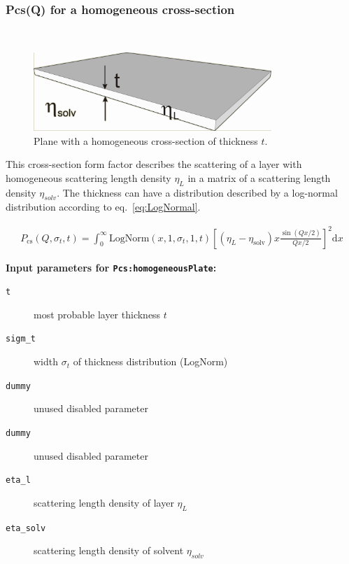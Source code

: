 \clearpage

\subsubsection{Pcs(Q) for a homogeneous cross-section}
\label{plugin:Pcs:homogeneousXS} ~\\

\begin{figure}[htb]
\begin{center}
\includegraphics[width=0.802\textwidth,height=0.265\textwidth]{../images/form_factor/anisotropic/Pcs_homogeneousXS_txt.png}
\end{center}
\caption{Plane with a homogeneous cross-section of thickness $t$.}
\label{fig:homogeneousXS}
\end{figure}

This cross-section form factor describes the scattering of a layer with homogeneous
scattering length density $\eta_L$ in a matrix of a scattering length density $\eta_{solv}$.
The thickness can have a distribution described by a log-normal distribution according to eq.\ \ref{eq:LogNormal}.

\begin{align}
P_\text{cs}(Q,\sigma_{t},t) = \int_0^\infty \textrm{LogNorm}(x,1,\sigma_{t},1,t)
    \left[ \left(\eta_L-\eta_\textrm{solv}\right) x \frac{\sin(Qx/2)}{Qx/2} \right]^2\textrm{d}x
\end{align}

\noindent
\textbf{Input parameters for \texttt{Pcs:homogeneousPlate}:}
\begin{description}
    \item[\texttt{t}] most probable layer thickness $t$
    \item[\texttt{sigm\_t}] width $\sigma_t$ of thickness distribution (LogNorm)
    \item[\texttt{dummy}] unused disabled parameter
    \item[\texttt{dummy}] unused disabled parameter
    \item[\texttt{eta\_l}] scattering length density of layer $\eta_L$
    \item[\texttt{eta\_solv}] scattering length density of solvent $\eta_{solv}$
\end{description}

